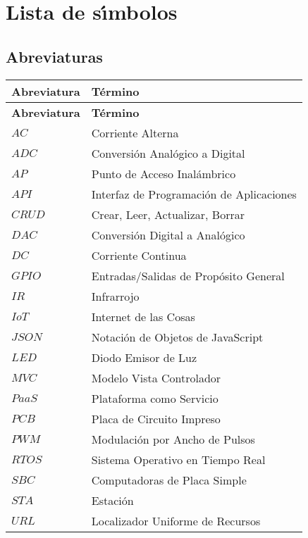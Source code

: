 \chapter*{Lista de s\'{\i}mbolos}

\section*{Abreviaturas}
\begin{longtable}[l]{>{}l<{}l}
  \textbf{Abreviatura} & \textbf{T\'{e}rmino} \\[0.5ex] \hline%
  \endfirsthead%
  \textbf{Abreviatura} & \textbf{T\'{e}rmino} \\[0.5ex] \hline%
  \endhead%
\renewcommand{\arraystretch}{1.4}\label{simbolosg}
 $AC$    &Corriente Alterna\\%
 $ADC$	 &Conversión Analógico a Digital\\%
 $AP$	 &Punto de Acceso Inalámbrico\\%
 $API$	 &Interfaz de Programación de Aplicaciones\\%
 $CRUD$  &Crear, Leer, Actualizar, Borrar\\%
 $DAC$	 &Conversión Digital a Analógico\\%
 $DC$    &Corriente Continua\\%
 $GPIO$  &Entradas/Salidas de Propósito General\\%
 $IR$    &Infrarrojo\\%
 $IoT$   &Internet de las Cosas\\%
 $JSON$  &Notación de Objetos de JavaScript\\%
 $LED$	 &Diodo Emisor de Luz\\%
 $MVC$	 &Modelo Vista Controlador\\%
 $PaaS$  &Plataforma como Servicio\\%
 $PCB$	 &Placa de Circuito Impreso\\%
 $PWM$	 &Modulación por Ancho de Pulsos\\%
 $RTOS$	 &Sistema Operativo en Tiempo Real\\%
 $SBC$   &Computadoras de Placa Simple\\%
 $STA$	 &Estación\\%
 $URL$	 &Localizador Uniforme de Recursos\\%

\end{longtable}


\setlength{\extrarowheight}{0pt}